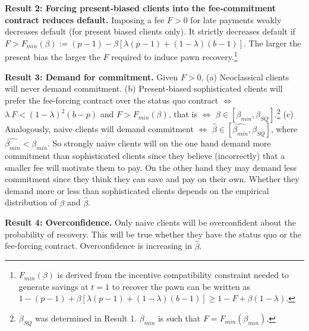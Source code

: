 \documentclass[oneside,11pt]{article}
\begin{document}
\vspace{.1in}
\noindent \textbf{Result 2: Forcing present-biased clients into the fee-commitment contract reduces default.} Imposing a fee $F>0$ for late payments weakly decreases default (for present biased clients only). It strictly decreases default if $F>F_{min}(\beta):=(p-1)-\beta[\lambda(p-1)+(1-\lambda)(b-1)]$. The larger the present bias the larger the $F$ required to induce pawn recovery.\footnote{$F_{min}(\beta)$ is derived from the incentive compatibility constraint needed to generate savings at $t=1$ to recover the pawn can be written as $1-(p-1)+\beta[\lambda(p-1)+(1-\lambda)(b-1)] \geq 1-F+\beta(1-\lambda)$.}

\vspace{.1in}
\noindent \textbf{Result 3: Demand for commitment.} Given $F>0$, (a) Neoclassical clients will never demand commitment. (b) Present-biased sophisticated clients will prefer the fee-forcing contract over the status quo contract $\iff$  $\lambda \: F<(1-\lambda)^2(b-p)$ and $F>F_{min}(\beta)$, that is $\iff$  $\beta \in [\beta_{min},\beta_{SQ}]$.\footnote{$\beta_{SQ}$ was determined in Result 1. $\beta_{min}$ is such that $F=F_{min}(\beta_{min})$.} (c) Analogously, naive clients will demand commitment $\iff$ $\hat{\beta} \in [\widehat{\beta_{min}},\beta_{SQ}]$, where $\widehat{\beta_{min}}<\beta_{min}$. So strongly naive clients will on the one hand demand more commitment than sophisticated clients since they believe (incorrectly) that a smaller fee will motivate them to pay. On the other hand they may demand less commitment since they think they can save and pay on their own. Whether they demand more or less than sophisticated clients depends on the empirical distribution of $\beta$ and $\hat{\beta}$. 

\vspace{.1in}
\noindent \textbf{Result 4: Overconfidence.} Only naive clients will be overconfident about the probability of recovery. This will be true whether they have the status quo or the fee-forcing contract. Overconfidence is increasing in $\hat{\beta}$.
\end{document}
